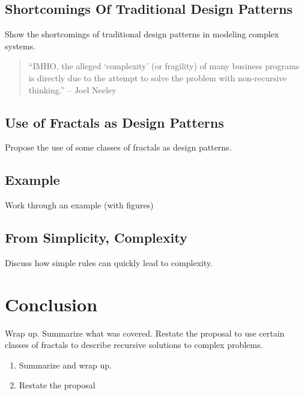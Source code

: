 \documentclass[jou,apacite]{apa6}
\begin{document}
\subsection{Shortcomings Of Traditional Design Patterns}
Show the shortcomings of traditional design patterns in modeling complex systems.

\begin{quote}
``IMHO, the alleged `complexity' (or fragility) of many business programs is directly due to the attempt to solve the problem with non-recursive thinking.'' -- Joel Neeley
\end{quote}

\subsection{Use of Fractals as Design Patterns}
Propose the use of some classes of fractals as design patterns.

\subsection{Example} %
Work through an example (with figures)

\subsection{From Simplicity, Complexity}
Discuss how simple rules can quickly lead to complexity.

\section{Conclusion}  %
Wrap up.  Summarize what was covered.  Restate the proposal to use certain classes of fractals to describe recursive solutions to complex problems.
\begin{enumerate}
  \item Summarize and wrap up.
  \item Restate the proposal
\end{enumerate}


\end{document}
